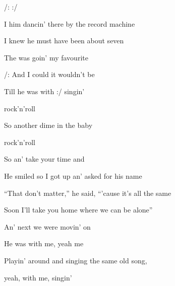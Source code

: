 

/:      :/ 

\zs
I  him dancin' there by the record machine

I knew he must have been about seven

The  was goin'   my favourite 

/: And I could  it wouldn't be 

Till he was with  :/ singin'
\ks

\zr
{} rock'n'roll 

So  another dime in the  baby

 rock'n'roll 

So  an' take your time and   
\kr

\zs
He smiled so I got up an' asked for his name

``That don't matter,'' he said, ``'cause it's all the same

Soon I'll take you home where we can be alone''

An' next we were movin' on

He was with me, yeah me

Playin' around and singing the same old song,

yeah, with me, singin'
\ks

\zr\kr

\kp
